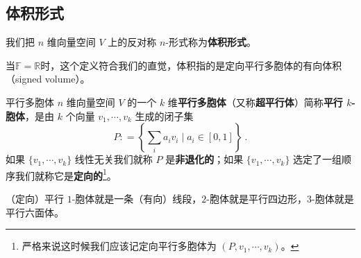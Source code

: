 
\begin{issues}
\issueDraft
\end{issues}


\subsection{体积形式}




我们把 $n$ 维向量空间 $V$ 上的反对称 $n$-形式称为\textbf{体积形式}。

当$\mathbb{F} = \mathbb{R}$时，这个定义符合我们的直觉，体积指的是定向平行多胞体的有向体积（signed volume）。

\begin{definition}{平行多胞体}
$n$ 维向量空间 $V$ 的一个 $k$ 维\textbf{平行多胞体}（又称\textbf{超平行体}）简称\textbf{平行 $k$-胞体}，是由 $k$ 个向量 $v_1, \cdots, v_k$ 生成的闭子集
\begin{equation}
P: = \left\{ \sum_i a_i v_i \mid a_i \in [0, 1] \right\}~.
\end{equation}
如果 $\{v_1, \cdots, v_k\}$ 线性无关我们就称 $P$ 是\textbf{非退化的}；如果 $\{v_1, \cdots, v_k\}$ 选定了一组顺序我们就称它是\textbf{定向的}\footnote{严格来说这时候我们应该记定向平行多胞体为 $(P, v_1, \cdots, v_k)$。}。
\end{definition}

\begin{example}{}
（定向）平行 $1$-胞体就是一条（有向）线段，$2$-胞体就是平行四边形，$3$-胞体就是平行六面体。
\end{example}


